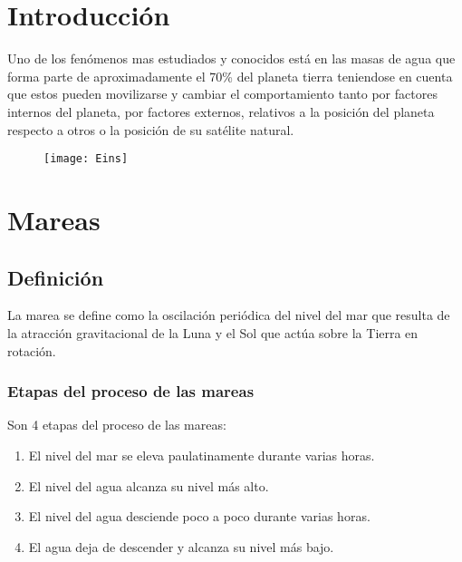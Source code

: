 \documentclass[12pt]{article}
\begin{document}
\section*{Introducción}
Uno de los fenómenos mas estudiados y conocidos está en las masas de agua que forma parte de aproximadamente el 70\% del planeta tierra teniendose en cuenta que estos pueden movilizarse y cambiar el comportamiento tanto por factores internos del planeta, por factores externos, relativos a la posición del planeta respecto a otros o la posición de su satélite natural. \\

\vspace{1cm}

\begin{figure}[h]
\centering
\texttt{[image: Eins]}
\end{figure}

 \newpage
 
 \section{Mareas}
 \vspace{0.35cm}
 \subsection{Definición}
La marea se define como la 
oscilación periódica del nivel 
del mar que resulta de la 
atracción gravitacional de la 
Luna y el Sol que actúa sobre 
la Tierra en rotación.
\vspace{0.25cm}
 
 \subsubsection{Etapas del proceso de las mareas}
 
 Son 4 etapas del proceso de las mareas:
\begin{enumerate}
\item El nivel del mar se eleva paulatinamente durante varias horas.

\item El nivel del agua alcanza su nivel más alto.

\item El nivel del agua desciende poco a poco durante varias horas.

\item El agua deja de descender y alcanza su nivel más bajo.
\end{enumerate}
\end{document}
